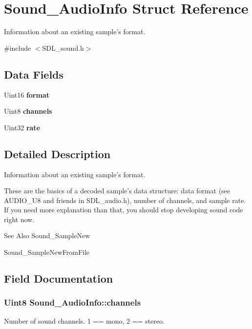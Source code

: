 \section{Sound\-\_\-\-Audio\-Info Struct Reference}
\label{structSound__AudioInfo}


Information about an existing sample's format.  




{\ttfamily \#include $<$S\-D\-L\-\_\-sound.\-h$>$}

\subsection*{Data Fields}
\begin{DoxyCompactItemize}
\item 
Uint16 {\bf format}
\item 
Uint8 {\bf channels}
\item 
Uint32 {\bf rate}
\end{DoxyCompactItemize}


\subsection{Detailed Description}
Information about an existing sample's format. 

These are the basics of a decoded sample's data structure\-: data format (see A\-U\-D\-I\-O\-\_\-\-U8 and friends in S\-D\-L\-\_\-audio.\-h), number of channels, and sample rate. If you need more explanation than that, you should stop developing sound code right now.

\begin{DoxySeeAlso}{See Also}
Sound\-\_\-\-Sample\-New 

Sound\-\_\-\-Sample\-New\-From\-File 
\end{DoxySeeAlso}


\subsection{Field Documentation}
\subsubsection[{channels}]{\setlength{\rightskip}{0pt plus 5cm}Uint8 Sound\-\_\-\-Audio\-Info\-::channels}\label{structSound__AudioInfo_a2a7fe880d009e698eb0d52cde3ddfc80}
Number of sound channels. 1 == mono, 2 == stereo. 
